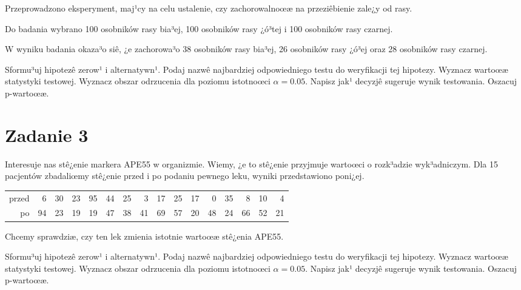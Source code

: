 \documentclass[a4paper,12pt]{article}
\begin{document}
  Przeprowadzono eksperyment, maj¹cy na celu ustalenie, czy zachorowalnoœæ na przeziêbienie zale¿y od rasy.
  
  Do badania wybrano 100 osobników rasy bia³ej, 100 osobników rasy ¿ó³tej i 100 osobników rasy czarnej. 
  
  W wyniku badania okaza³o siê, ¿e zachorowa³o 38 osobników rasy bia³ej, 26 osobników rasy ¿ó³ej oraz 28 osobników rasy czarnej. 
  
  Sformu³uj hipotezê zerow¹ i alternatywn¹. 
  Podaj nazwê najbardziej odpowiedniego testu do weryfikacji tej hipotezy. 
  Wyznacz wartoœæ statystyki testowej. 
  Wyznacz obszar odrzucenia dla poziomu istotnoœci $\alpha=0.05$. 
  Napisz jak¹ decyzjê sugeruje wynik testowania. Oszacuj p-wartoœæ. \vspace{1cm} 

  \section*{Zadanie 3}
     
  Interesuje nas stê¿enie markera APE55  w organizmie. 
  Wiemy, ¿e to stê¿enie przyjmuje wartoœci o rozk³adzie wyk³adniczym. 
  Dla 15 pacjentów zbadaliœmy stê¿enie przed i po podaniu pewnego leku, 
  wyniki przedstawiono poni¿ej.
  
  \vspace{0.5cm} 
  \noindent\begin{center} 
\begin{tabular}{rrrrrrrrrrrrrrrr}
  \hline
  \hline
przed & 6 & 30 & 23 & 95 & 44 & 25 & 3 & 17 & 25 & 17 & 0 & 35 & 8 & 10 & 4 \\
  po & 94 & 23 & 19 & 19 & 47 & 38 & 41 & 69 & 57 & 20 & 48 & 24 & 66 & 52 & 21 \\
   \hline
\end{tabular}
 
  \end{center} 
  \vspace{0.5cm}
  
  Chcemy sprawdziæ, czy ten lek zmienia istotnie wartoœæ stê¿enia APE55.
  
  Sformu³uj hipotezê zerow¹ i alternatywn¹. 
  Podaj nazwê najbardziej odpowiedniego testu do weryfikacji tej hipotezy. 
  Wyznacz wartoœæ statystyki testowej. 
  Wyznacz obszar odrzucenia dla poziomu istotnoœci $\alpha=0.05$. 
  Napisz jak¹ decyzjê sugeruje wynik testowania. Oszacuj p-wartoœæ. \vspace{1cm} 
\end{document}
